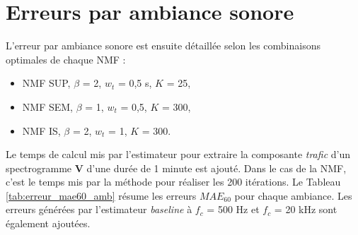 \section{Erreurs par ambiance sonore}

L'erreur par ambiance sonore est ensuite détaillée selon les combinaisons optimales de chaque NMF : 

\begin{itemize}
\item NMF SUP, $\beta$ = 2, $w_t$ = 0,5 s, $K$ = 25,
\item NMF SEM, $\beta$ = 1, $w_t$ = 0,5, $K$ = 300,
\item NMF IS, $\beta$ = 2, $w_t$ = 1, $K$ = 300.
\end{itemize}

 Le temps de calcul mis par l'estimateur pour extraire la composante \textit{trafic} d'un spectrogramme $\mathbf{V}$ d'une durée de 1 minute est ajouté. Dans le cas de la NMF, c'est le temps mis par la méthode pour réaliser les 200 itérations. Le Tableau \ref{tab:erreur_mae60_amb} résume les erreurs $MAE_{60}$ pour chaque ambiance. Les erreurs générées par l'estimateur \textit{baseline} à $f_c$ = 500 Hz et $f_c$ = 20 kHz sont également ajoutées.

\begin{table}[h]
\centering
\caption{Erreurs $MAE_{60}$ selon les estimateurs NMF pour chaque méthode dans sa combinaison optimale de modalités avec les estimateurs \textit{baseline} à 500 Hz et 20 kHz. En gras-rouge, les erreurs les plus faibles, en gras-noir, les erreurs de la NMF inférieures à l'estimateur \textit{baseline} $f_c$ = 500 Hz.}
\label{tab:erreur_mae60_amb}
\end{table}

